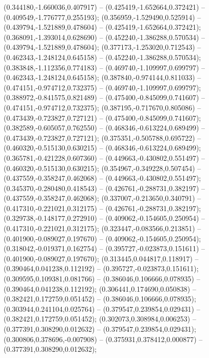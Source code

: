  (0.344180,-1.660036,0.407917) -- (0.425419,-1.652664,0.372421) -- (0.409549,-1.776777,0.255193);
 (0.356959,-1.529490,0.525914) -- (0.439794,-1.521889,0.478604) -- (0.425419,-1.652664,0.372421);
 (0.368091,-1.393014,0.628690) -- (0.452240,-1.386288,0.570534) -- (0.439794,-1.521889,0.478604);
 (0.377173,-1.253020,0.712543) -- (0.462343,-1.248124,0.645158) -- (0.452240,-1.386288,0.570534);
 (0.383848,-1.112356,0.774183) -- (0.469740,-1.109997,0.699797) -- (0.462343,-1.248124,0.645158);
 (0.387840,-0.974144,0.811033) -- (0.474151,-0.974712,0.732375) -- (0.469740,-1.109997,0.699797);
 (0.388972,-0.841575,0.821489) -- (0.475400,-0.845099,0.741607) -- (0.474151,-0.974712,0.732375);
 (0.387195,-0.717670,0.805086) -- (0.473439,-0.723827,0.727121) -- (0.475400,-0.845099,0.741607);
 (0.382589,-0.605057,0.762550) -- (0.468346,-0.613224,0.689499) -- (0.473439,-0.723827,0.727121);
 (0.375351,-0.505788,0.695722) -- (0.460320,-0.515130,0.630215) -- (0.468346,-0.613224,0.689499);
 (0.365781,-0.421228,0.607360) -- (0.449663,-0.430802,0.551497) -- (0.460320,-0.515130,0.630215);
 (0.354967,-0.349228,0.507454) -- (0.437559,-0.358247,0.462068) -- (0.449663,-0.430802,0.551497);
 (0.345370,-0.280480,0.418543) -- (0.426761,-0.288731,0.382197) -- (0.437559,-0.358247,0.462068);
 (0.337007,-0.213650,0.340791) -- (0.417310,-0.221021,0.312175) -- (0.426761,-0.288731,0.382197);
 (0.329738,-0.148177,0.272910) -- (0.409062,-0.154605,0.250954) -- (0.417310,-0.221021,0.312175);
 (0.323447,-0.083566,0.213851) -- (0.401900,-0.089027,0.197670) -- (0.409062,-0.154605,0.250954);
 (0.318042,-0.019371,0.162754) -- (0.395727,-0.023873,0.151611) -- (0.401900,-0.089027,0.197670);
 (0.313445,0.044817,0.118917) -- (0.390464,0.041238,0.112192) -- (0.395727,-0.023873,0.151611);
 (0.309595,0.109381,0.081766) -- (0.386046,0.106666,0.078935) -- (0.390464,0.041238,0.112192);
 (0.306441,0.174690,0.050838) -- (0.382421,0.172759,0.051452) -- (0.386046,0.106666,0.078935);
 (0.303944,0.241104,0.025764) -- (0.379547,0.239854,0.029431) -- (0.382421,0.172759,0.051452);
 (0.302073,0.308984,0.006253) -- (0.377391,0.308290,0.012632) -- (0.379547,0.239854,0.029431);
 (0.300806,0.378696,-0.007908) -- (0.375931,0.378412,0.000877) -- (0.377391,0.308290,0.012632);
